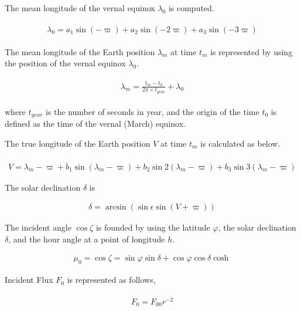 The mean longitude of the vernal equinox \(\lambda_{0}\) is computed.

\begin{eqnarray}
\begin{array}{c}
\lambda_{0}=a_{1} \sin (-\varpi)+a_{2} \sin (-2 \varpi)+a_{3} \sin (-3 \varpi)
\end{array}
\end{eqnarray}

The mean longitude of the Earth position \(\lambda_{m}\) at time \(t_m\) is represented by using the position of the vernal equinox \(\lambda_{0}\).

\begin{eqnarray}
\begin{array}{c}
\lambda_{m}=\frac{t_{m}-t_{0}}{2 \pi \times t_{year}}+\lambda_{0}
\end{array}
\end{eqnarray}

where \(t_{year}\) is the number of seconds in year, and the origin of the time \(t_0\) is defined as the time of the vernal (March) equinox.

The true longitude of the Earth position \(V\) at time \(t_m\) is calculated as below.

\begin{eqnarray}
\\V=\lambda_{m}-\varpi+b_{1} \sin \left(\lambda_{m}-\varpi\right)+b_{2} \sin 2\left(\lambda_{m}-\varpi\right)+b_{3} \sin 3\left(\lambda_{m}-\varpi\right)
\end{eqnarray}

The solar declination \(\delta\) is

\begin{eqnarray}
\delta=\arcsin (\sin \epsilon \sin (V+\varpi))
\end{eqnarray}

The incident angle \(\cos \zeta\) is founded by using the latitude \(\varphi\), the solar declination \(\delta\), and the hour angle at a point of longitude \(h\).

\begin{eqnarray}
\mu_{0}=\cos \zeta=\sin \varphi \sin \delta+\cos \varphi \cos \delta \cosh
\end{eqnarray}

Incident Flux \(F_0\) is represented as follows,

\begin{eqnarray}
\begin{array}{c}
F_{0}=F_{00} r^{-2}
\end{array}
\end{eqnarray}

